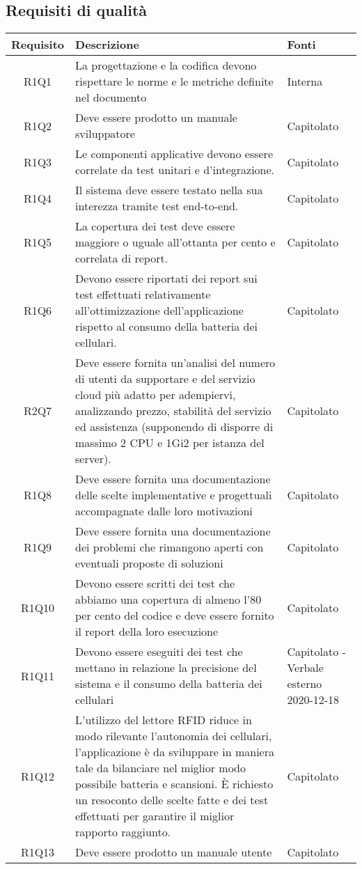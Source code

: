 \subsection{Requisiti di qualità}
\begin{center}
	\begin{longtable}{|c|p{10cm}|p{4cm}|}
		\hline
		\rowcolor{lighter-grayer}
		\textbf{Requisito} & \textbf{Descrizione} & \textbf{Fonti}  \\
		\hline
		\endhead
		
		 R1Q1 &La progettazione e la codifica devono rispettare le norme e le metriche definite nel documento \dext{Piano di qualifica v1.0.0} & Interna\\
		\hline	
		R1Q2 &Deve essere prodotto un manuale sviluppatore & Capitolato\\
		\hline
		R1Q3 &Le componenti applicative devono essere correlate da test unitari e d’integrazione. & Capitolato\\
		\hline
		R1Q4 &Il sistema deve essere testato nella sua interezza tramite test end-to-end. & Capitolato\\
		\hline
		R1Q5 &La copertura dei test deve essere maggiore o uguale all'ottanta per cento e correlata di report. & Capitolato\\
		\hline
		R1Q6 &Devono essere riportati dei report sui test effettuati relativamente all’ottimizzazione dell’applicazione rispetto al consumo della batteria dei cellulari. & Capitolato\\
		\hline
		R2Q7&	Deve essere fornita un'analisi del numero di utenti da supportare e del servizio cloud più adatto per adempiervi, analizzando prezzo, stabilità del servizio ed assistenza (supponendo di disporre di massimo 2 CPU e 1Gi2 per istanza del server).& Capitolato	\\
		\hline
		R1Q8&Deve essere fornita una documentazione delle scelte implementative e progettuali accompagnate dalle loro motivazioni	& Capitolato	\\
		\hline
		R1Q9	&Deve essere fornita una documentazione dei problemi che rimangono aperti con eventuali proposte di soluzioni	& Capitolato	\\
		\hline
		R1Q10&Devono essere scritti dei test che abbiamo una copertura di almeno l'80 per cento del codice e deve essere fornito il report della loro esecuzione	& 	Capitolato \\
		\hline
		
		R1Q11&Devono essere eseguiti dei test che mettano in relazione la precisione del sistema e il consumo della batteria dei cellulari	& Capitolato - Verbale esterno 2020-12-18	\\
		\hline
		R1Q12&L’utilizzo del lettore RFID riduce in modo rilevante l’autonomia dei cellulari, l’applicazione è da sviluppare in maniera tale da bilanciare nel miglior modo possibile batteria e scansioni. È richiesto un resoconto delle scelte fatte e dei test effettuati per garantire il miglior rapporto raggiunto.	& Capitolato	\\
		\hline
		R1Q13& Deve essere prodotto un manuale utente	& Capitolato	\\
		\hline
	\end{longtable}
\end{center}
